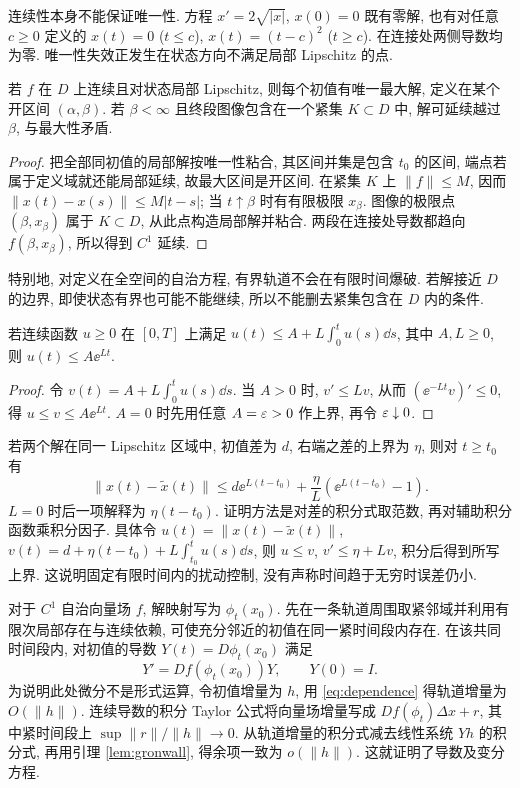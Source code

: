 连续性本身不能保证唯一性. 方程 $x'=2\sqrt{|x|}$, $x(0)=0$ 既有零解, 也有对任意 $c\ge0$ 定义的 $x(t)=0$ ($t\le c$), $x(t)=(t-c)^2$ ($t\ge c$). 在连接处两侧导数均为零. 唯一性失效正发生在状态方向不满足局部 Lipschitz 的点.
\begin{theorem}[最大解与延续]\label{thm:continuation}
若 $f$ 在 $D$ 上连续且对状态局部 Lipschitz, 则每个初值有唯一最大解, 定义在某个开区间 $(\alpha,\beta)$. 若 $\beta<\infty$ 且终段图像包含在一个紧集 $K\subset D$ 中, 解可延续越过 $\beta$, 与最大性矛盾.
\end{theorem}
\begin{proof}
把全部同初值的局部解按唯一性粘合, 其区间并集是包含 $t_0$ 的区间, 端点若属于定义域就还能局部延续, 故最大区间是开区间. 在紧集 $K$ 上 $\|f\|\le M$, 因而 $\|x(t)-x(s)\|\le M|t-s|$; 当 $t\uparrow\beta$ 时有有限极限 $x_\beta$. 图像的极限点 $(\beta,x_\beta)$ 属于 $K\subset D$, 从此点构造局部解并粘合. 两段在连接处导数都趋向 $f(\beta,x_\beta)$, 所以得到 $C^1$ 延续.
\end{proof}
特别地, 对定义在全空间的自治方程, 有界轨道不会在有限时间爆破. 若解接近 $D$ 的边界, 即使状态有界也可能不能继续, 所以不能删去紧集包含在 $D$ 内的条件.
\begin{lemma}\label{lem:gronwall}
若连续函数 $u\ge0$ 在 $[0,T]$ 上满足 $u(t)\le A+L\int_0^t u(s)\dd s$, 其中 $A,L\ge0$, 则 $u(t)\le A\ee^{Lt}$.
\end{lemma}
\begin{proof}
令 $v(t)=A+L\int_0^t u(s)\dd s$. 当 $A>0$ 时, $v'\le Lv$, 从而 $(\ee^{-Lt}v)'\le0$, 得 $u\le v\le A\ee^{Lt}$. $A=0$ 时先用任意 $A=\varepsilon>0$ 作上界, 再令 $\varepsilon\downarrow0$.
\end{proof}
若两个解在同一 Lipschitz 区域中, 初值差为 $d$, 右端之差的上界为 $\eta$, 则对 $t\ge t_0$ 有
\begin{equation}\label{eq:dependence}
\|x(t)-\widetilde x(t)\|\le d\ee^{L(t-t_0)}+\frac{\eta}{L}(\ee^{L(t-t_0)}-1).
\end{equation}
$L=0$ 时后一项解释为 $\eta(t-t_0)$. 证明方法是对差的积分式取范数, 再对辅助积分函数乘积分因子. 具体令 $u(t)=\|x(t)-\widetilde x(t)\|$, $v(t)=d+\eta(t-t_0)+L\int_{t_0}^t u(s)\dd s$, 则 $u\le v$, $v'\le\eta+Lv$, 积分后得到所写上界. 这说明固定有限时间内的扰动控制, 没有声称时间趋于无穷时误差仍小.

对于 $C^1$ 自治向量场 $f$, 解映射写为 $\phi_t(x_0)$. 先在一条轨道周围取紧邻域并利用有限次局部存在与连续依赖, 可使充分邻近的初值在同一紧时间段内存在. 在该共同时间段内, 对初值的导数 $Y(t)=D\phi_t(x_0)$ 满足
\begin{equation}\label{eq:variational}
Y'=Df(\phi_t(x_0))Y,\qquad Y(0)=I.
\end{equation}
为说明此处微分不是形式运算, 令初值增量为 $h$, 用 \eqref{eq:dependence} 得轨道增量为 $O(\|h\|)$. 连续导数的积分 Taylor 公式将向量场增量写成 $Df(\phi_t)\Delta x+r$, 其中紧时间段上 $\sup\|r\|/\|h\|\to0$. 从轨道增量的积分式减去线性系统 $Yh$ 的积分式, 再用引理 \ref{lem:gronwall}, 得余项一致为 $o(\|h\|)$. 这就证明了导数及变分方程.

